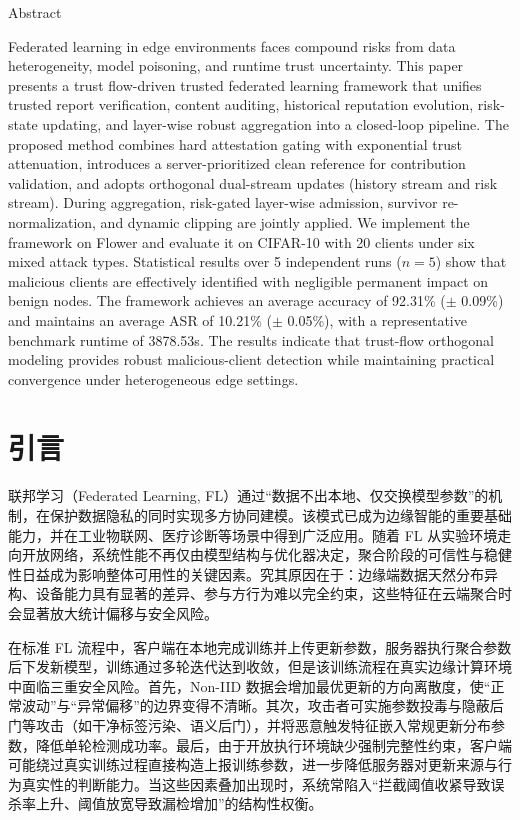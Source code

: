 \documentclass[11pt, a4paper, UTF8, fontset=fandol]{ctexart}
\begin{document}
    \begin{center}
        Abstract
    \end{center}
    Federated learning in edge environments faces compound risks from data
    heterogeneity, model poisoning, and runtime trust uncertainty. This paper presents
    a trust flow-driven trusted federated learning framework that unifies trusted
    report verification, content auditing, historical reputation evolution, risk-state
    updating, and layer-wise robust aggregation into a closed-loop pipeline. The
    proposed method combines hard attestation gating with exponential trust
    attenuation, introduces a server-prioritized clean reference for contribution
    validation, and adopts orthogonal dual-stream updates (history stream and risk
    stream). During aggregation, risk-gated layer-wise admission, survivor re-normalization,
    and dynamic clipping are jointly applied. We implement the framework on Flower and evaluate it on CIFAR-10 with 20 clients
under six mixed attack types. Statistical results over 5 independent runs
($n=5$) show that malicious clients are effectively identified with
negligible permanent impact on benign nodes. The framework achieves an average
accuracy of 92.31\% ($\pm$ 0.09\%) and maintains an average ASR of 10.21\% ($\pm$ 0.05\%), with a
representative benchmark runtime of 3878.53s. The results indicate that
trust-flow orthogonal modeling provides robust malicious-client detection
while maintaining practical convergence under heterogeneous edge settings.

\section{引言}
联邦学习（Federated Learning, FL）通过“数据不出本地、仅交换模型参数”的机制，在保护数据隐私的同时实现多方协同建模\cite{kairouz2021flsurvey}。该模式已成为边缘智能的重要基础能力，并在工业物联网、医疗诊断等场景中得到广泛应用。随着 FL 从实验环境走向开放网络，系统性能不再仅由模型结构与优化器决定，聚合阶段的可信性与稳健性日益成为影响整体可用性的关键因素。究其原因在于：边缘端数据天然分布异构、设备能力具有显著的差异、参与方行为难以完全约束，这些特征在云端聚合时会显著放大统计偏移与安全风险。

在标准 FL 流程中，客户端在本地完成训练并上传更新参数，服务器执行聚合参数后下发新模型，训练通过多轮迭代达到收敛，但是该训练流程在真实边缘计算环境中面临三重安全风险。首先，Non-IID 数据会增加最优更新的方向离散度，使“正常波动”与“异常偏移”的边界变得不清晰。其次，攻击者可实施参数投毒与隐蔽后门等攻击（如干净标签污染、语义后门）\cite{gu2017badnets,wang2019neuralcleanse}，并将恶意触发特征嵌入常规更新分布参数，降低单轮检测成功率。最后，由于开放执行环境缺少强制完整性约束，客户端可能绕过真实训练过程直接构造上报训练参数，进一步降低服务器对更新来源与行为真实性的判断能力。当这些因素叠加出现时，系统常陷入“拦截阈值收紧导致误杀率上升、阈值放宽导致漏检增加”的结构性权衡。
\end{document}
